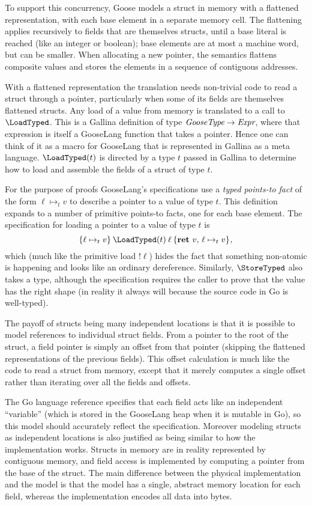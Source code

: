 To support this concurrency, Goose models a struct in memory with a
flattened representation, with each base element in a separate memory
cell. The flattening applies recursively to fields that are themselves
structs, until a base literal is reached (like an integer or boolean);
base elements are at most a machine word, but can be smaller. When
allocating a new pointer, the semantics flattens composite values and
stores the elements in a sequence of contiguous addresses.

With a flattened representation the translation needs non-trivial code to read a struct
through a pointer, particularly when some of its fields are themselves flattened
structs. Any load of a value from memory is translated to a call to
$\LoadTyped$. This is a Gallina definition of type
$\textit{GooseType} \to \textit{Expr}$, where that expression is itself a
GooseLang function that takes a pointer. Hence one can think of it as a macro
for GooseLang that is represented in Gallina as a meta language. $\LoadTyped(t)$
is directed by a type $t$ passed in Gallina to determine how to load and
assemble the fields of a struct of type $t$.

For the purpose of proofs GooseLang's specifications use a \emph{typed points-to fact}
of the form $\ell \mapsto_t v$ to describe a pointer to a value of type $t$. This
definition expands to a number of primitive points-to facts, one for
each base element. The specification for loading a pointer to a value of type
$t$ is
\[
\hoare{\ell \mapsto_t v}{\LoadTyped(t) \app \ell}{\Ret{v} \ell \mapsto_t v},
\] which
(much like the primitive load $!\ell$) hides the fact that something
non-atomic is happening and looks like an ordinary dereference.
Similarly, $\StoreTyped$ also takes a type, although the specification
requires the caller to prove that the value has the right shape (in
reality it always will because the source code in Go is well-typed).

The payoff of structs being many independent locations is that it is
possible to model references to individual struct fields. From a pointer
to the root of the struct, a field pointer is simply an offset from that
pointer (skipping the flattened representations of the previous fields).
This offset calculation is much like the code to read a struct from
memory, except that it merely computes a single offset rather than
iterating over all the fields and offsets.

The Go language reference specifies that each field acts like an
independent ``variable'' (which is stored in the GooseLang heap when it
is mutable in Go), so this model should accurately reflect the
specification. Moreover modeling structs as independent locations is
also justified as being similar to how the implementation works. Structs
in memory are in reality represented by contiguous memory, and field
access is implemented by computing a pointer from the base of the
struct. The main difference between the physical implementation and the
model is that the model has a single, abstract memory location for each field,
whereas the implementation encodes all data into bytes.

